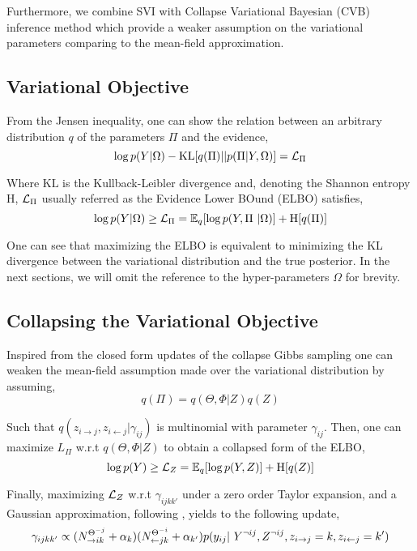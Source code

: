 Furthermore, we combine SVI with Collapse Variational Bayesian (CVB) inference method \cite{teh2006collapsed} which provide a weaker assumption on the variational parameters comparing to the mean-field approximation.


\subsection{Variational Objective}

From the Jensen inequality, one can show the relation between an arbitrary distribution $q$ of the parameters $\Pi$ and the evidence, 
\begin{equation*}
\log p(Y | \Omega) - \textrm{KL}[q(\Pi)||p(\Pi | Y, \Omega)] = \mathcal{L}_\Pi
\end{equation*}

Where $\textrm{KL}$ is the Kullback-Leibler divergence and, denoting the Shannon entropy $\textrm{H}$, $\mathcal{L}_\Pi$ usually referred as the Evidence Lower BOund (ELBO) satisfies, 
\begin{equation*}
\log p(Y|\Omega) \geq \mathcal{L}_\Pi = \mathbb{E}_{q}[\log p(Y, \Pi\ | \Omega)] + \textrm{H}[q(\Pi)] 
\end{equation*}

One can see that maximizing the ELBO is equivalent to minimizing the KL divergence between the variational distribution and the true posterior.
In the next sections, we will omit the reference to the hyper-parameters $\Omega$ for brevity.

\subsection{Collapsing the Variational Objective}
Inspired from the closed form updates of the collapse Gibbs sampling one can weaken the mean-field assumption made over the variational distribution by assuming,
\begin{equation*}
q(\Pi) = q(\Theta, \Phi | Z) q(Z)
\end{equation*}

Such that $q(z_{i \rightarrow j}, z_{i \leftarrow j}|\gamma_{ij})$ is multinomial with parameter $\gamma_{ij}$. Then, one can maximize $L_\Pi$ w.r.t $q(\Theta, \Phi | Z)$ to obtain a collapsed form of the ELBO,
\begin{equation*}
\log p(Y) \geq \mathcal{L}_Z = \mathbb{E}_{q}[\log p(Y, Z)] + \textrm{H}[q(Z)]
\end{equation*}

Finally, maximizing $\mathcal{L}_Z$ w.r.t $\gamma_{ijkk'}$ under a zero order Taylor expansion, and a Gaussian approximation, following \cite{teh2006collapsed}\cite{asuncion2009smoothing}, yields to the following update,
\begin{equation} \label{eq:maximization}
\gamma_{ijkk'} \propto (N_{\rightarrow ik}^{\Theta^{-j}} + \alpha_k) (N_{\leftarrow jk}^{\Theta^{-i}} + \alpha_{k'}) p(y_{ij} | Y^{\neg ij}, Z^{\neg ij}, \zij=k, \zji=k')
\end{equation}

